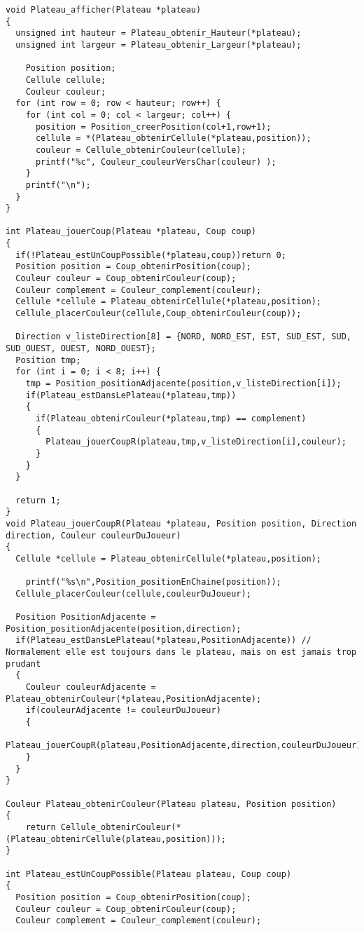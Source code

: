 \begin{lstlisting}
void Plateau_afficher(Plateau *plateau)
{
  unsigned int hauteur = Plateau_obtenir_Hauteur(*plateau);
  unsigned int largeur = Plateau_obtenir_Largeur(*plateau);

    Position position;
    Cellule cellule;
    Couleur couleur;
  for (int row = 0; row < hauteur; row++) {
    for (int col = 0; col < largeur; col++) {
      position = Position_creerPosition(col+1,row+1);
      cellule = *(Plateau_obtenirCellule(*plateau,position));
      couleur = Cellule_obtenirCouleur(cellule);
      printf("%c", Couleur_couleurVersChar(couleur) );
    }
    printf("\n");
  }
}

int Plateau_jouerCoup(Plateau *plateau, Coup coup)
{
  if(!Plateau_estUnCoupPossible(*plateau,coup))return 0;
  Position position = Coup_obtenirPosition(coup);
  Couleur couleur = Coup_obtenirCouleur(coup);
  Couleur complement = Couleur_complement(couleur);
  Cellule *cellule = Plateau_obtenirCellule(*plateau,position);
  Cellule_placerCouleur(cellule,Coup_obtenirCouleur(coup));

  Direction v_listeDirection[8] = {NORD, NORD_EST, EST, SUD_EST, SUD, SUD_OUEST, OUEST, NORD_OUEST};
  Position tmp;
  for (int i = 0; i < 8; i++) {
    tmp = Position_positionAdjacente(position,v_listeDirection[i]);
    if(Plateau_estDansLePlateau(*plateau,tmp))
    {
      if(Plateau_obtenirCouleur(*plateau,tmp) == complement)
      {
        Plateau_jouerCoupR(plateau,tmp,v_listeDirection[i],couleur);
      }
    }
  }

  return 1;
}
void Plateau_jouerCoupR(Plateau *plateau, Position position, Direction direction, Couleur couleurDuJoueur)
{
  Cellule *cellule = Plateau_obtenirCellule(*plateau,position);

    printf("%s\n",Position_positionEnChaine(position));
  Cellule_placerCouleur(cellule,couleurDuJoueur);

  Position PositionAdjacente = Position_positionAdjacente(position,direction);
  if(Plateau_estDansLePlateau(*plateau,PositionAdjacente)) // Normalement elle est toujours dans le plateau, mais on est jamais trop prudant
  {
    Couleur couleurAdjacente = Plateau_obtenirCouleur(*plateau,PositionAdjacente);
    if(couleurAdjacente != couleurDuJoueur)
    {
        Plateau_jouerCoupR(plateau,PositionAdjacente,direction,couleurDuJoueur);
    }
  }
}

Couleur Plateau_obtenirCouleur(Plateau plateau, Position position)
{
	return Cellule_obtenirCouleur(*(Plateau_obtenirCellule(plateau,position)));
}

int Plateau_estUnCoupPossible(Plateau plateau, Coup coup)
{
  Position position = Coup_obtenirPosition(coup);
  Couleur couleur = Coup_obtenirCouleur(coup);
  Couleur complement = Couleur_complement(couleur);


\end{lstlisting}
